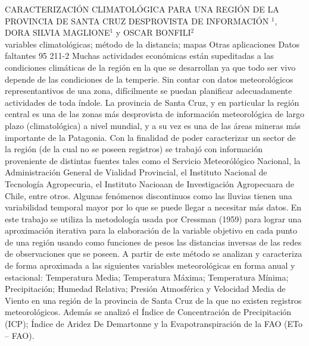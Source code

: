 \A
{CARACTERIZACIÓN CLIMATOLÓGICA PARA UNA REGIÓN DE LA PROVINCIA DE SANTA CRUZ DESPROVISTA DE INFORMACIÓN}
{$^1$, DORA SILVIA MAGLIONE$^1$ y OSCAR BONFILI$^2$}
{
\\}
{variables climatológicas; método de la distancia; mapas} 
 {Otras aplicaciones} 
 {Datos faltantes} 
 {95} 
 {211-2}
{Muchas actividades económicas están supeditadas a las condiciones climáticas de la región en la que se desarrollan ya que todo ser vivo depende de las condiciones de la temperie. Sin contar con datos meteorológicos representantivos de una zona, difícilmente se puedan planificar adecuadamente actividades de toda índole. La provincia de Santa Cruz, y en particular la región central es una de las zonas más desprovista de información meteorológica de largo plazo (climatológica) a nivel mundial, y a su vez es una de las áreas mineras más importante de la Patagonia. Con la finalidad de poder caracterizar un sector de la región (de la cual no se poseen registros) se trabajó con información proveniente de distintas fuentes tales como el Servicio Meteorólógico Nacional, la Administración General de Vialidad Provincial, el Instituto Nacional de Tecnología Agropecuria, el Instituto Nacioaan de Investigación Agropecuara de Chile, entre otros. Algunas fenómenos discontinuos como las lluvias tienen una variabilidad temporal mayor por lo que se puede llegar a necesitar más datos. En este trabajo se utiliza la metodología usada por Cressman (1959) para lograr una aproximación iterativa para la elaboración de la variable objetivo en cada punto de una región usando como funciones de pesos las distancias inversas de las redes de observaciones que se poseen. A partir de este método se analizan y caracteriza de forma aproximada a las siguientes variables meteorológicas en forma anual y estacional: Temperatura Media; Temperatura Máxima; Temperatura Mínima; Precipitación; Humedad Relativa; Presión Atmosférica y Velocidad Media de Viento en una región de la provincia de Santa Cruz de la que no existen registros meteorológicos. Además se analizó el Índice de Concentración de Precipitación (ICP); Índice de Aridez De Demartonne y la Evapotranspiración de la FAO (ETo – FAO).}
